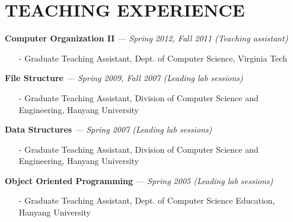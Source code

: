 \section{TEACHING EXPERIENCE} 
\vspace{0.03in} 
   {\bf Computer Organization II}
   {\it \footnotesize --- Spring 2012, Fall 2011 (Teaching assistant)}
    \begin{itemize}[leftmargin=*]
    \setlength\itemsep{-0.02in}
      \item[-] {\small Graduate Teaching Assistant, Dept. of Computer Science, Virginia
      Tech}
    \end{itemize}
\vspace{-0.15in}
   {\bf File Structure}
   {\it \footnotesize --- Spring 2009, Fall 2007 (Leading lab sessions)}
    \begin{itemize}[leftmargin=*]
    \setlength\itemsep{-0.02in}
      \item[-] {\small Graduate Teaching Assistant, Division of Computer Science and
      Engineering, Hanyang University}
    \end{itemize}
\vspace{-0.15in}
   {\bf Data Structures}
   {\it \footnotesize --- Spring 2007 (Leading lab sessions)}
    \begin{itemize}[leftmargin=*]
    \setlength\itemsep{-0.02in}
      \item[-] {\small Graduate Teaching Assistant, Division of Computer Science and
      Engineering, Hanyang University}
    \end{itemize}
\vspace{-0.15in}
   {\bf Object Oriented Programming}
   {\it \footnotesize --- Spring 2005 (Leading lab sessions)}
    \begin{itemize}[leftmargin=*]
    \setlength\itemsep{-0.02in}
      \item[-] {\small Graduate Teaching Assistant, Dept. of Computer Science
      Education, Hanyang University}
    \end{itemize}

